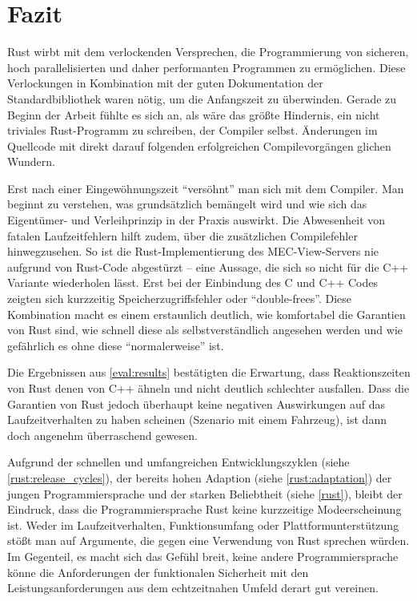 \chapter{Fazit}


Rust wirbt mit dem verlockenden Versprechen, die Programmierung von sicheren, hoch parallelisierten und daher performanten Programmen zu ermöglichen.
Diese Verlockungen in Kombination mit der guten Dokumentation der Standardbibliothek waren nötig, um die Anfangszeit zu überwinden.
Gerade zu Beginn der Arbeit fühlte es sich an, als wäre das größte Hindernis, ein nicht triviales Rust-Programm zu schreiben, der Compiler selbst.
Änderungen im Quellcode mit direkt darauf folgenden erfolgreichen Compilevorgängen glichen Wundern.

Erst nach einer Eingewöhnungszeit \enquote{versöhnt} man sich mit dem Compiler.
Man beginnt zu verstehen, was grundsätzlich bemängelt wird und wie sich das Eigentümer- und Verleihprinzip in der Praxis auswirkt.
Die Abwesenheit von fatalen Laufzeitfehlern hilft zudem, über die zusätzlichen Compilefehler hinwegzusehen.
So ist die Rust-Implementierung des MEC-View-Servers nie aufgrund von Rust-Code abgestürzt -- eine Aussage, die sich so nicht für die C++ Variante wiederholen lässt.
Erst bei der Einbindung des C und C++ Codes zeigten sich kurzzeitig Speicherzugriffsfehler oder \enquote{double-frees}.
Diese Kombination macht es einem erstaunlich deutlich, wie komfortabel die Garantien von Rust sind, wie schnell diese als selbstverständlich angesehen werden und wie gefährlich es ohne diese \enquote{normalerweise} ist.

Die Ergebnissen aus \autoref{eval:results} bestätigten die Erwartung, dass Reaktionszeiten von Rust denen von C++ ähneln und nicht deutlich schlechter ausfallen.
Dass die Garantien von Rust jedoch überhaupt keine negativen Auswirkungen auf das Laufzeitverhalten zu haben scheinen (Szenario mit einem Fahrzeug), ist dann doch angenehm überraschend gewesen.

Aufgrund der schnellen und umfangreichen Entwicklungszyklen (siehe \autoref{rust:release_cycles}), der bereits hohen Adaption (siehe \autoref{rust:adaptation}) der jungen Programmiersprache und der starken Beliebtheit (siehe \autoref{rust}), bleibt der Eindruck, dass die Programmiersprache Rust keine kurzzeitige Modeerscheinung ist.
Weder im Laufzeitverhalten, Funktionsumfang oder Plattformunterstützung stößt man auf Argumente, die gegen eine Verwendung von Rust sprechen würden.
Im Gegenteil, es macht sich das Gefühl breit, keine andere Programmiersprache könne die Anforderungen der funktionalen Sicherheit mit den Leistungsanforderungen aus dem echtzeitnahen Umfeld derart gut vereinen.

